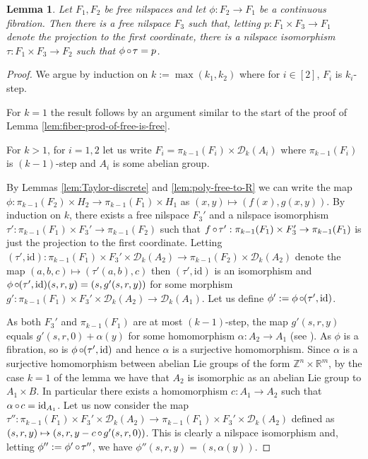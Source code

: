 \documentclass[a4paper,12pt,reqno]{amsart}
\newtheorem{lemma}[theorem]{Lemma}
\theoremstyle{definition}
\def\to{\rightarrow}
\newcommand{\mc}{\mathcal}
\newcommand{\id}{\mathrm{id}}
\DeclareMathOperator{\co}{\circ\hspace{-0.02 cm}}
\begin{document}
\begin{lemma}\label{lem:strong-splitting}
Let $F_1,F_2$ be free nilspaces and let $\phi:F_2\to F_1$ be a continuous fibration. Then there is a free nilspace $F_3$ such that, letting $p:F_1\times F_3\to F_1$ denote the projection to the first coordinate, there is a nilspace isomorphism $\tau:F_1\times F_3\to F_2$ such that $\phi\co\tau=p$.
\end{lemma}

\begin{proof}
We argue by induction on  $k:=\max(k_1,k_2)$ where for $i\in[2]$, $F_i$ is $k_i$-step. 

For $k=1$ the result follows by an argument similar to the start of the proof of Lemma \ref{lem:fiber-prod-of-free-is-free}. 

For $k>1$, for $i=1,2$ let us write $F_i=\pi_{k-1}(F_i)\times \mathcal{D}_k(A_i)$ where $\pi_{k-1}(F_i)$ is $(k-1)$-step and $A_i$ is some abelian group.

By Lemmas \ref{lem:Taylor-discrete} and \ref{lem:poly-free-to-R} we can write the map $\phi:\pi_{k-1}(F_2)\times H_2\to \pi_{k-1}(F_1)\times H_1$ as $(x,y)\mapsto (f(x),g(x,y))$. By induction on $k$, there exists a free nilspace $F_3'$ and a nilspace isomorphism $\tau':\pi_{k-1}(F_1)\times F_3' \to \pi_{k-1}(F_2)$ such that $f\co \tau':\pi_{k-1}(F_1)\times F_3'\to \pi_{k-1}(F_1)$ is just the projection to the first coordinate.  Letting $(\tau',\id):\pi_{k-1}(F_1)\times  F_3'\times \mc{D}_k(A_2)\to \pi_{k-1}(F_2)\times \mc{D}_k(A_2)$ denote the map $ (a,b,c)\mapsto (\tau'(a,b),c)$  then $(\tau',\id)$ is an isomorphism and $\phi\co (\tau',\id)(s,r,y)=(s,g'(s,r,y))$ for some morphism $g':\pi_{k-1}(F_1)\times F_3' \times \mc{D}_k(A_2)\to \mc{D}_k(A_1)$. Let us define $\phi':=\phi\co (\tau',\id)$.

As both $F_3'$ and $\pi_{k-1}(F_1)$ are at most $(k-1)$-step, the map $g'(s,r,y)$ equals $g'(s,r,0)+\alpha(y)$ for some homomorphism $\alpha:A_2\to A_1$ (see \cite[Definition 3.3.1]{Cand:Notes1}). As $\phi$ is a fibration, so is $\phi\co (\tau',\id)$ and hence $\alpha$ is a surjective homomorphism. Since $\alpha$ is a surjective homomorphism between abelian Lie groups of the form $\mathbb{Z}^n\times\mathbb{R}^m$, by the case $k=1$ of the lemma we have that $A_2$ is isomorphic as an abelian Lie group to $A_1\times B$. In particular there exists a homomorphism $c:A_1\to A_2$ such that $\alpha\co c =\id_{A_1}$. Let us now consider the map $\tau'':\pi_{k-1}(F_1)\times  F_3'\times \mc{D}_k(A_2)\to \pi_{k-1}(F_1)\times  F_3' \times \mc{D}_k(A_2)$ defined as $(s,r,y)\mapsto(s,r,y-c\co g'(s,r,0))$. This is clearly a nilspace isomorphism and, letting $\phi'':=\phi'\co \tau''$,  we have $\phi''(s,r,y)=(s,\alpha(y))$.


\end{proof}
\end{document}
